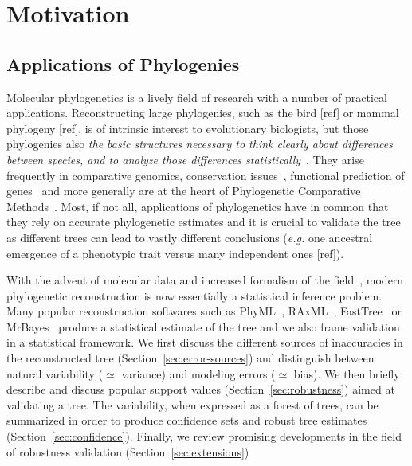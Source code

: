 \section{Motivation} \label{sec:Motivation}

\subsection{Applications of Phylogenies} \label{sec:applications}

Molecular phylogenetics is a lively field of research with a number of practical applications. 
Reconstructing large phylogenies, such as the bird [ref] or mammal phylogeny [ref], is of intrinsic interest 
to evolutionary biologists, but those phylogenies also \emph{the basic structures necessary to think clearly about differences between species, and to analyze those differences statistically}~\citep{Felsenstein2004}. They arise frequently in comparative genomics, conservation issues~\citep{Bordewich2008}, functional prediction of genes~\citep{Eisen1998} and more generally are at the heart of Phylogenetic Comparative Methods~\citep{Revell2008, Pennell2013}. Most, if not all, applications of phylogenetics have in common that they rely on accurate phylogenetic estimates and it is crucial to validate the tree as different trees can lead to vastly different conclusions (\emph{e.g.} one ancestral emergence of a phenotypic trait versus many independent ones [ref]).  

With the advent of molecular data and increased formalism of the field~\citep{Gascuel2005a}, modern phylogenetic reconstruction is now essentially a statistical inference problem. Many popular reconstruction softwares such as PhyML~\citep{Guindon2003}, RAxML~\citep{Stamatakis2006}, FastTree~\citep{Price2010} or MrBayes~\citep{Ronquist2003} produce a statistical estimate of the tree and we also frame validation in a statistical framework. We first discuss the different sources of inaccuracies in the reconstructed tree (Section~\ref{sec:error-sources}) and distinguish between natural variability ($\simeq$ variance) and modeling errors ($\simeq$ bias). We then briefly describe and discuss popular support values (Section~\ref{sec:robustness}) aimed at validating a tree. The variability, when expressed as a forest of trees, can be summarized in order to produce confidence sets and robust tree estimates (Section~\ref{sec:confidence}). Finally, we review promising developments in the field of robustness validation (Section~\ref{sec:extensions})

